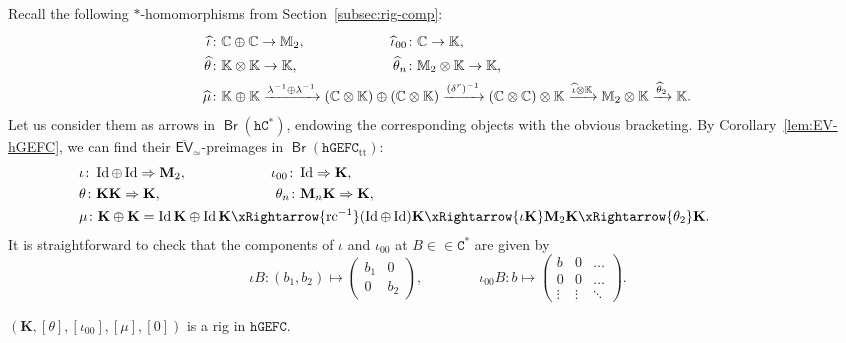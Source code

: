 \documentclass[10pt]{simplearticle}
\newcommand{\Id}{\operatorname{Id}}
\newcommand{\hGEFC}{\mathtt{hGEFC}}
\newcommand{\Cstar}{\mathtt{C^{*}}}
\newcommand{\hCstar}{\mathtt{hC^{*}}}
\newcommand{\mathsb}[1]{\boldsymbol{\mathsf{#1}}}
\newcommand{\rc}{\operatorname{rc}}
\newcommand{\Br}{\operatorname{\mathsb{Br}}}
\newcommand{\EV}{\mathsb{EV}}
\newcommand{\oK}{\mathbb{K}}
\newcommand{\fK}{\mathbf{K}}
\newcommand{\fM}{\mathbf{M}}
\newcommand{\oM}{\mathbb{M}}
\newcommand{\ttt}{\operatorname{tt}}
\newcommand{\hspc}[1]{\hspace{#1ex}}
\begin{document}
Recall the following $*$-homomorphisms from Section~\ref{subsec:rig-comp}:
\begin{alignat*}{2}
 &\ 
& \widehat{\iota}\colon & \mathbb{C}\oplus\mathbb{C}\to\oM_{2},\hspc 4\phantom{\mathbb{K}\mathbb{K}\mathbb{K}\widehat{\theta}_{n}}\quad\widehat{\iota}_{00}\colon\mathbb{C}\to\oK,\\
 &\ 
& \widehat{\theta}\colon & \oK\otimes\oK\to\oK,\hspc 4\phantom{\mathbb{C}\mathbb{C}\mathbb{M}_{2}\widehat{\iota}_{00}}\quad\widehat{\theta}_{n}\colon\oM_{2}\otimes\oK\to\oK,\\
 &\ 
& \widehat{\mu}\colon & \oK\oplus\oK\xrightarrow{\lambda^{-1}\oplus\lambda^{-1}}(\mathbb{C}\otimes\oK)\oplus(\mathbb{C}\otimes\oK)\xrightarrow{(\delta^{r})^{-1}}(\mathbb{C}\otimes\mathbb{C})\otimes\oK\xrightarrow{\widehat{\iota}\otimes\oK}\oM_{2}\otimes\oK\xrightarrow{\widehat{\theta}_{2}}\oK.
\end{alignat*}
Let us consider them as arrows in $\Br(\hCstar)$, endowing the corresponding
objects with the obvious bracketing. By Corollary~\ref{lem:EV-hGEFC},
we can find their $\overline{\EV}_{\simeq}$-preimages in $\Br(\hGEFC_{\ttt})$:
\begin{alignat*}{2}
 & \iota\colon\Id\oplus\Id\Rightarrow\fM_{2},\hspc 3\phantom{\fK\fK\fK\theta_{n}}\quad\iota_{00}\colon\Id\Rightarrow\fK,\\
 & \theta\colon\fK\fK\Rightarrow\fK,\hspc 3\phantom{\Id\oplus\Id\fM_{2}\iota_{00}}\quad\theta_{n}\colon\fM_{n}\fK\Rightarrow\fK,\\
 & \mu\colon\fK\oplus\fK=\Id\fK\oplus\Id\fK\xRightarrow{\rc^{-1}}(\Id\oplus\Id)\fK\xRightarrow{\iota\fK}\fM_{2}\fK\xRightarrow{\theta_{2}}\fK. & \hspc{12}
\end{alignat*}
It is straightforward to check that the components of $\iota$ and
$\iota_{00}$ at $B\in\in\Cstar$ are given by
\[
\iota B\colon(b_{1},b_{2})\mapsto\left(\begin{array}{cc}
b_{1} & 0\\
0 & b_{2}
\end{array}\right),\qquad\qquad\iota_{00}B\colon b\mapsto\left(\begin{array}{ccc}
b & 0 & \ldots\\
0 & 0 & \ldots\\
\vdots & \vdots & \ddots
\end{array}\right).
\]

\begin{prop}\label{prop:rig-K}
$(\fK,[\theta],[\iota_{00}],[\mu],[0])$ is a rig
in $\hGEFC$.
\end{prop}
\end{document}

